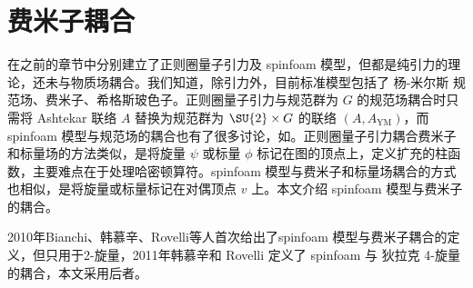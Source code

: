 
\chapter{费米子耦合}

	在之前的章节中分别建立了正则圈量子引力及 spinfoam 模型，但都是纯引力的理论，还未与物质场耦合。我们知道，除引力外，目前标准模型包括了 杨-米尔斯 规范场、费米子、希格斯玻色子。正则圈量子引力与规范群为 $G$ 的规范场耦合时只需将 Ashtekar 联络 $A$ 替换为规范群为 $\SU{2} \times G$ 的联络 $(A , A_{\text{YM}})$\cite{Rovelli2004,Thiemann2007}，而 spinfoam 模型与规范场的耦合也有了很多讨论，如\cite{Alexander2011,Mikovic2002,Speziale2007mt}。正则圈量子引力耦合费米子和标量场的方法类似，是将旋量 $\psi$ 或标量 $\phi$ 标记在图的顶点上，定义扩充的柱函数\cite{Rovelli2004,Han2005,Thiemann2007}，主要难点在于处理哈密顿算符。spinfoam 模型与费米子和标量场耦合的方式也相似，是将旋量或标量标记在对偶顶点 $v$ 上。本文介绍 spinfoam 模型与费米子的耦合。

	2010年Bianchi、韩慕辛、Rovelli等人首次给出了spinfoam 模型与费米子耦合的定义，但只用于2-旋量\cite{Bianchi2010bn}，2011年韩慕辛和 Rovelli 定义了 spinfoam 与 狄拉克 4-旋量的耦合\cite{Han2011}，本文采用后者。

